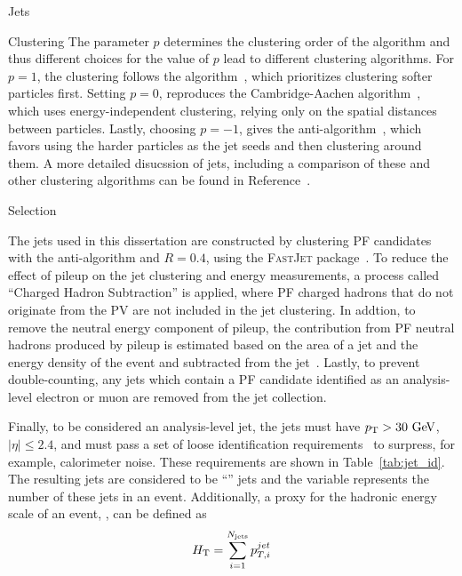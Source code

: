 \begin{section}{Jets}
\begin{subsection}{Clustering}
The parameter $p$ determines the clustering order of the algorithm and thus different choices for the value of $p$ lead to different clustering algorithms.
For $p = 1$, the clustering follows the \kT algorithm~\cite{Ellis:1993tq}, which prioritizes clustering softer particles first.
Setting $p = 0$, reproduces the Cambridge-Aachen algorithm~\cite{Dokshitzer:1997in}, which uses energy-independent clustering, relying only on the spatial distances between particles.
Lastly, choosing $p = -1$, gives the anti-\kT algorithm~\cite{Cacciari:2008gp}, which favors using the harder particles as the jet seeds and then clustering around them.
A more detailed disucssion of jets, including a comparison of these and other clustering algorithms can be found in Reference~\cite{Salam:2009jx}.

\end{subsection}

\begin{subsection}{Selection}

The jets used in this dissertation are constructed by clustering PF candidates with the anti-\kT algorithm and $R = 0.4$, using the \textsc{FastJet} package~\cite{Cacciari:2011ma}.
To reduce the effect of pileup on the jet clustering and energy measurements, a process called ``Charged Hadron Subtraction'' is applied, where PF charged hadrons that do not originate from the PV are not included in the jet clustering.
In addtion, to remove the neutral energy component of pileup, the contribution from PF neutral hadrons produced by pileup is estimated based on the area of a jet and the energy density of the event and subtracted from the jet~\cite{Cacciari:2007fd}.
Lastly, to prevent double-counting, any jets which contain a PF candidate identified as an analysis-level electron or muon are removed from the jet collection. 

Finally, to be considered an analysis-level jet, the jets must have $p_{\mathrm{T}} > 30~\mathrm{Ge\kern -0.1em V}$, $|\eta| \leq 2.4$, and must pass a set of loose identification requirements~\cite{jet_id,1748-0221-6-11-P11002} to surpress, for example, calorimeter noise.
These requirements are shown in Table~\ref{tab:jet_id}.
The resulting jets are considered to be ``\smallR'' jets  and the variable \Njets represents the number of these jets in an event.
Additionally, a proxy for the hadronic energy scale of an event, \HT, can be defined as
\begin{align}
H_{\mathrm{T}} = \sum_{i = 1}^{N_{\mathrm{jets}}} p_{T,i}^{jet}
\end{align}


\end{subsection}
\end{section}

